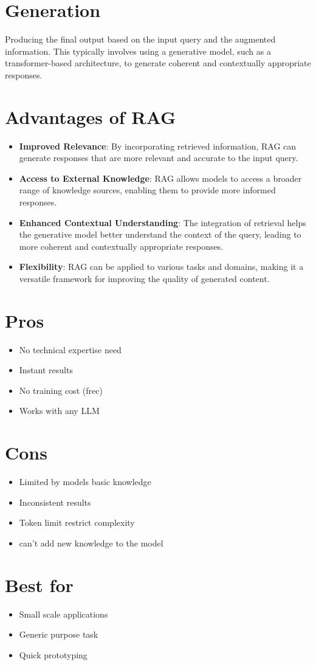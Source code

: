 \documentclass[conference]{IEEEtran}
\begin{document}
\section*{Generation}
Producing the final output based on the input query and the augmented information. This typically involves using a generative model, such as a transformer-based architecture, to generate coherent and contextually appropriate responses.

\section*{Advantages of RAG}
\begin{itemize}
    \item \textbf{Improved Relevance}: By incorporating retrieved information, RAG can generate responses that are more relevant and accurate to the input query.
    \item \textbf{Access to External Knowledge}: RAG allows models to access a broader range of knowledge sources, enabling them to provide more informed responses.
    \item \textbf{Enhanced Contextual Understanding}: The integration of retrieval helps the generative model better understand the context of the query, leading to more coherent and contextually appropriate responses.
    \item \textbf{Flexibility}: RAG can be applied to various tasks and domains, making it a versatile framework for improving the quality of generated content.
\end{itemize}


\section*{Pros}
\begin{itemize}
    \item No technical expertise need
    \item Instant results
    \item No training cost (frec)
    \item Works with any LLM
\end{itemize}

\section*{Cons}
\begin{itemize}
    \item Limited by models basic knowledge
    \item Inconsistent results
    \item Token limit restrict complexity 
    \item can't add new knowledge to the model
\end{itemize}

\section*{Best for}
\begin{itemize}
    \item Small scale applications
    \item Generic purpose task
    \item Quick prototyping
\end{itemize}
\end{document}
